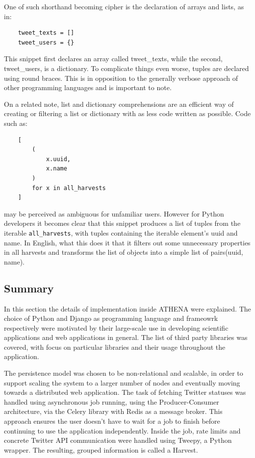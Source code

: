 \documentclass[12pt,a4paper,twoside]{report}
\begin{document}
One of such shorthand becoming cipher is the declaration of arrays and lists, as in:
\begin{lstlisting}
    tweet_texts = []
    tweet_users = {}
\end{lstlisting}

This snippet first declares an array called tweet\_texts, while the second, tweet\_users, is a dictionary. To complicate things even worse, tuples are declared using round braces. This is in opposition to the generally verbose approach of other programming languages and is important to note.

On a related note, list and dictionary comprehensions are an efficient way of creating or filtering a list or dictionary with as less code written as possible. Code such as:

\begin{lstlisting}
    [
        (
            x.uuid,
            x.name
        )
        for x in all_harvests
    ]
\end{lstlisting}

may be perceived as ambiguous for unfamiliar users. However for Python developers it becomes clear that this snippet produces a list of tuples from the iterable \texttt{all\_harvests}, with tuples containing the iterable element's uuid and name. In English, what this does it that it filters out some unnecessary properties in all harvests and transforms the list of objects into a simple list of pairs(uuid, name).

\subsection*{Summary}
In this section the details of implementation inside ATHENA were explained. The choice of Python and Django as programming language and frameowrk respectively were motivated by their large-scale use in developing scientific applications and web applications in general. The list of third party libraries was covered, with focus on particular libraries and their usage throughout the application.

The persistence model was chosen to be non-relational and scalable, in order to support scaling the system to a larger number of nodes and eventually moving towards a distributed web application. The task of fetching Twitter statuses was handled using asynchronous job running, using the Producer-Consumer architecture, via the Celery library with Redis as a message broker. This approach ensures the user doesn't have to wait for a job to finish before continuing to use the application independently. Inside the job, rate limits and concrete Twitter API communication were handled using Tweepy, a Python wrapper. The resulting, grouped information is called a Harvest.
\end{document}
